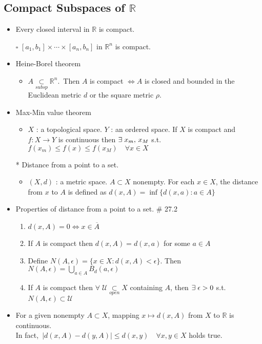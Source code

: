 \documentclass[12pt]{article}
\newcommand{\sq}{$\square$}
\newcommand{\spone}{\hspace{0.1cm}}
\newcommand{\Real}{\mathbb{R}}
\newcommand{\U}{\mathcal{U}}
\newcommand{\open}{\underset{open}{\subset}}
\newcommand{\subsp}{\underset{subsp}{\subset}}
\newcommand{\cl}{\overline}
\newcommand{\exist}{\exists\spone}
\begin{document}
\subsection{Compact Subspaces of $\Real$}
\smallskip
\begin{itemize}
	\item Every closed interval in $\Real$ is compact.
	\item[\sq] $[a_1,b_1]\times \cdots \times [a_n, b_n]$ in $\Real^n$ is compact.
	\item Heine-Borel theorem
	\begin{itemize}
		\item $A\subsp \Real^n$.\, Then $A$ is compact $\Leftrightarrow A$ is closed and bounded in the Euclidean metric $d$ or the square metric $\rho$.
	\end{itemize}
	\item Max-Min value theorem
	\begin{itemize}
		\item $X$ : a topological space. $Y$ : an ordered space. If $X$ is compact and $f: X\rightarrow Y$ is continuous then $\exist x_m,\, x_M$ s.t. $f(x_m)\leq f(x)\leq f(x_M)\quad \forall x\in X$
	\end{itemize} 
	\item[*] Distance from a point to a set.
	\begin{itemize}
		\item $(X,d)$ : a metric space. $A\subset X$ nonempty. For each $x\in X$, the distance from $x$ to $A$ is defined as $d(x,A)=\inf\{d(x,a):a\in A\}$
	\end{itemize}
	\item Properties of distance from a point to a set. \quad \# 27.2
	\begin{enumerate}
		\item $d(x,A)=0 \Leftrightarrow x\in \cl{A}$
		\item If $A$ is compact then $d(x,A)=d(x,a)$ for some $a\in A$
		\item Define $N(A, \epsilon)=\{x\in X : d(x,A)<\epsilon\}$. Then $N(A, \epsilon)=\bigcup_{a\in A}B_d(a,\epsilon)$
		\item If $A$ is compact then $\forall\; \U\open X$ containing $A$, then $\exist \epsilon>0$ s.t. $N(A, \epsilon)\subset \U$
	\end{enumerate}
	\item For a given nonempty $A\subset X$, mapping $x\mapsto d(x,A)$ from $X$ to $\Real$ is continuous.
	\\In fact,\, $|d(x,A)-d(y,A)|\leq d(x,y)\quad \forall x,y\in X$\; holds true.

\end{itemize}
\end{document}
